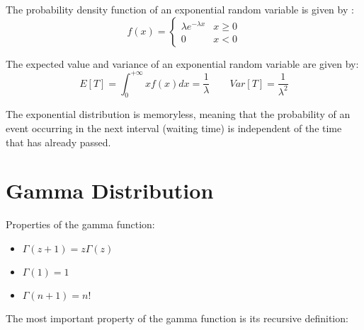 The probability density function of an exponential random variable is given by :
\[
f(x) = 
\begin{cases}
    \lambda e^{-\lambda x} & x \geq 0 \\
    0 & x < 0
\end{cases}
\]

The expected value and variance of an exponential random variable are given by:
\[
E[T] = \int_{0}^{+\infty} x f(x) dx = \frac{1}{\lambda} \qquad Var[T] = \frac{1}{\lambda^2}
\]

The exponential distribution is memoryless, meaning that the probability of an event occurring in the next interval (waiting time) is independent of the time that has already passed.


\section{Gamma Distribution}


Properties of the gamma function:
\begin{itemize}
    \item $\Gamma(z+1) = z\Gamma(z)$
    \item $\Gamma(1) = 1$
    \item $\Gamma(n+1) = n!$
\end{itemize}

The most important property of the gamma function is its recursive definition:

